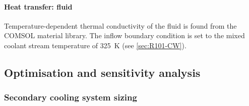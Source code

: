 \paragraph{Heat transfer: fluid}
Temperature-dependent thermal conductivity of the fluid is found from the COMSOL material library. The inflow boundary condition is set to the mixed coolant stream temperature of \SI{325}{\K} (see \cref{sec:R101-CW}).

\subsection{Optimisation and sensitivity analysis}

\subsubsection{Secondary cooling system sizing}

